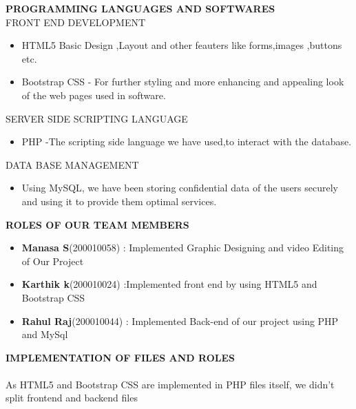 \documentclass[12pt]{article}
\begin{document}
\newpage
{\large\textbf{PROGRAMMING LANGUAGES AND SOFTWARES}}\\

{\large\textsc{FRONT END DEVELOPMENT}}
\begin{itemize}
    \item HTML5 Basic Design ,Layout and other feauters like forms,images ,buttons etc.
    \item Bootstrap CSS - For further styling and more enhancing and appealing look of the web pages used in software.
\end{itemize}
\vspace{15pt}
{\large\textsc{SERVER SIDE SCRIPTING LANGUAGE}}
\begin{itemize}
\item PHP -The scripting side language we have used,to interact with the database.
\end{itemize}
\vspace{15pt}
{\large\textsc{DATA BASE MANAGEMENT}}
\begin{itemize}
\item Using MySQL, we have been storing confidential data of the users securely and using it to provide them optimal services.
\end{itemize}
\vspace{15pt}
{\large\textbf{ROLES OF OUR TEAM MEMBERS}}
\begin{itemize}
\item \textbf{Manasa S}(200010058) : Implemented Graphic Designing and video Editing of Our Project
\item {\textbf{Karthik k}}(200010024) :Implemented front end by using HTML5 and Bootstrap CSS
\item \textbf{Rahul Raj}(200010044) : Implemented Back-end of our project using PHP and MySql
\end{itemize}
\vspace{15pt}
\newpage
{\large\textbf{IMPLEMENTATION OF FILES AND ROLES}}\\\\
As HTML5 and Bootstrap CSS are implemented in PHP files itself, we didn't split frontend and backend files
\end{document}
